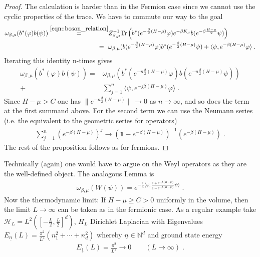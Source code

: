 \documentclass[
a4paper, %
11pt, %
onecolumn, %
openany, %
]{memoir}
\theoremstyle{definition}
\theoremstyle{remark}
\theoremstyle{plain}
\begin{document}
\begin{proof}
	The calculation is harder than in the Fermion case since we cannot use the cyclic properties of the trace. We have to commute our way to the goal \begin{align}
	\omega_{\beta,\mu}(b^*(\varphi)b(\psi))\overset{\eqref{eqn::boson_relation}}{=}&Z_{\beta,\mu}^{-1}\mathrm{Tr}\left(b^*(e^{-\frac{\beta}{2}(H-\mu)}\varphi)e^{-\beta K_{\mu}}b(e^{-\beta \frac{H-\mu}{2}}\psi)\right)\\
	=~~&\omega_{\beta,\mu}(b(e^{-\frac{\beta}{2}(H-\mu)}\varphi)b^*(e^{-\frac{\beta}{2}(H-\mu)}\psi)+\langle \psi, e^{-\beta (H-\mu)} \varphi\rangle\; .
	\end{align}
	Iterating this identity n-times gives \begin{align}
	\omega_{\beta,\mu}(b^*(\varphi)b(\psi))=&\omega_{\beta,\mu}\left(b^*(e^{-n\frac{\beta}{2}(H-\mu)}\varphi)b(e^{-n\frac{\beta}{2}(H-\mu)}\psi)\right)\\
	+&\sum_{j=1}^{n}\langle \psi, e^{-j\beta(H-\mu)}\varphi\rangle\; .
	\end{align}
	Since $H-\mu > C$ one has $\|e^{-n\frac{\beta}{2}(H-\mu)}\|\rightarrow 0$ as $n\rightarrow\infty$, and so does the term at the first summand above. For the second term we can use the Neumann series (i.e. the equivalent to the geometric series for operators) \begin{align}
	\sum_{j=1}^n\left(e^{-\beta(H-\mu)}\right)^j\rightarrow \left(\mathds{1}-e^{-\beta(H-\mu)}\right)^{-1}\left(e^{-\beta(H-\mu)}\right)\; .
	\end{align}
	The rest of the proposition follows as for fermions. 
	\end{proof}
	Technically (again) one would have to argue on the Weyl operators as they are the well-defined object. The analogous Lemma is \begin{align}
	\omega_{\beta,\mu}(W(\psi))=e^{-\frac{1}{4}\langle\psi, \frac{1+e^{-\beta(H-\mu)}}{1-e^{-\beta(H-\mu)}}\psi\rangle}\; .
	\end{align}
	Now the thermodynamic limit: If $H-\mu\geq C > 0$ uniformly in the volume, then the limit $L\rightarrow \infty$ can be taken as in the fermionic case. As a regular example take $\mathcal{H}_L=L^2\left(\left[-\frac{L}{2},\frac{L}{2}\right]^d\right)$, $H_L$ Dirichlet Laplacian with Eigenvalues $E_{\underline{n}}(L)=\frac{\pi^2}{L^2}(n_1^2+\cdots+n_d^2)$ whereby $\underline{n}\in \mathbb{N}^d$ and ground state energy \begin{align}
	E_{\underline{1}}(L)=\frac{\pi^2}{L^2}\rightarrow 0 \qquad (L\rightarrow \infty)\; .
	\end{align}
\end{document}
